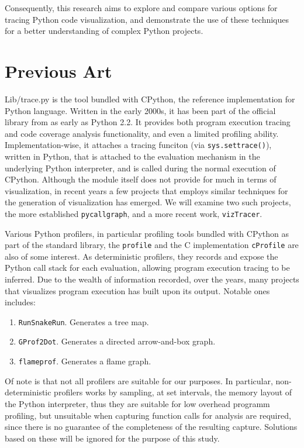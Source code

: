 \documentclass[conference]{IEEEtran}
\begin{document}
Consequently, this research aims to explore and compare various options for tracing Python code visualization, and demonstrate the use of these techniques for a better understanding of complex Python projects.\par

\section{Previous Art} 
Lib/trace.py is the tool bundled with CPython, the reference implementation for Python language\cite{cpythonlibtracepy}. Written in the early 2000s, it has been part of the official library from as early as Python 2.2. It provides both program execution tracing and code coverage analysis functionality, and even a limited profiling ability. Implementation-wise, it attaches a tracing funciton (via \texttt{sys.settrace()}), written in Python, that is attached to the evaluation mechanism in the underlying Python interpreter, and is called during the normal execution of CPython\cite{trace}. Although the module itself does not provide for much in terms of visualization, in recent years a few projects that employs similar techniques for the generation of visualization has emerged. We will examine two such projects, the more established \texttt{pycallgraph}, and a more recent work, \texttt{vizTracer}.


Various Python profilers, in particular profiling tools bundled with CPython as part of the standard library, the \texttt{profile} and the C implementation \texttt{cProfile} are also of some interest. As deterministic profilers, they records and expose the Python call stack for each evaluation, allowing program execution tracing to be inferred. Due to the wealth of information recorded, over the years, many projects that visualizes program execution has built upon its output. Notable ones includes: \par
\begin{enumerate}
    \item \texttt{RunSnakeRun}. Generates a tree map.
    \item \texttt{GProf2Dot}. Generates a directed arrow-and-box graph.
    \item \texttt{flameprof}. Generates a flame graph.
\end{enumerate}
Of note is that not all profilers are suitable for our purposes. In particular, non-deterministic profilers works by sampling, at set intervals, the memory layout of the Python interpreter, thus they are suitable for low overhead programm profiling, but unsuitable when capturing function calls for analysis are required, since there is no guarantee of the completeness of the resulting capture. Solutions based on these will be ignored for the purpose of this study.\par
\end{document}
